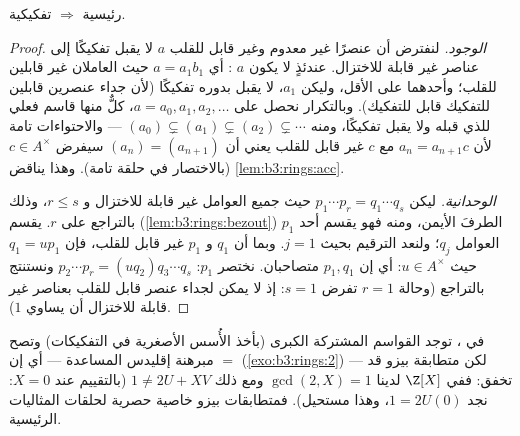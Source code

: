 \begin{theorem}\label{thm:b3:rings:pidufd}
رئيسية $\Rightarrow$ تفكيكية.
\end{theorem}

\begin{proof}
\emph{الوجود.} لنفترض أن عنصرًا غير معدوم وغير قابل للقلب $a$ لا
يقبل تفكيكًا إلى عناصر غير قابلة للاختزال. عندئذٍ لا يكون $a$
: أي $a =
a_1b_1$ حيث العاملان غير قابلين للقلب؛
وأحدهما على الأقل، وليكن $a_1$، لا يقبل بدوره تفكيكًا (لأن جداء
عنصرين قابلين للتفكيك قابل للتفكيك). وبالتكرار نحصل على $a = a_0, a_1, a_2,
\dots$،
كلٌّ منها قاسم فعلي للذي قبله ولا يقبل تفكيكًا، ومنه $(a_0) \subsetneq (a_1) \subsetneq (a_2) \subsetneq \cdots$
--- والاحتواءات تامة لأن $a_n = a_{n+1}c$ مع $c$ غير قابل للقلب
يعني أن $(a_n) = (a_{n+1})$ سيفرض $c \in A^\times$ (بالاختصار في حلقة تامة).
وهذا يناقض \cref{lem:b3:rings:acc}.

\emph{الوحدانية.} ليكن $p_1 \cdots p_r = q_1 \cdots q_s$ حيث جميع العوامل غير قابلة
للاختزال و $r \leq s$، وذلك بالتراجع على $r$. يقسم 
(\cref{lem:b3:rings:bezout}) $p_1$ الطرفَ الأيمن، ومنه فهو يقسم أحد العوامل
$q_j$؛ ولنعد الترقيم بحيث $j = 1$. وبما أن $q_1$  و $p_1$ غير قابل للقلب، فإن $q_1 = u p_1$ حيث
$u \in A^\times$: أي إن $p_1,
q_1$ متصاحبان. نختصر $p_1$: $p_2 \cdots p_r = (u q_2)
q_3\cdots q_s$
ونستنتج بالتراجع (وحالة $r = 1$ تفرض $s = 1$: إذ لا يمكن لجداء
عنصر قابل للقلب بعناصر غير قابلة للاختزال أن يساوي $1$).
\end{proof}

\begin{remark}\label{rem:b3:rings:ufdgcd}
في ، توجد القواسم المشتركة الكبرى (بأخذ الأُسس
الأصغرية في التفكيكات) وتصح مبرهنة إقليدس المساعدة --- أي إن
 $=$  (\cref{exo:b3:rings:2}) --- لكن متطابقة
بيزو قد تخفق: ففي $\Z[X]$ لدينا $\gcd(2, X) = 1$ ومع ذلك
$1 \neq 2U + XV$ (بالتقييم عند $X = 0$: نجد $1 = 2U(0)$، وهذا
مستحيل). فمتطابقات بيزو خاصية حصرية لحلقات المثاليات الرئيسية.
\end{remark}

